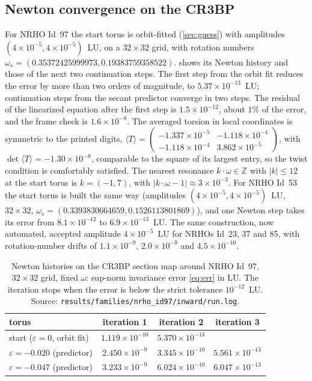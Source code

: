 \documentclass[11pt]{article}
\newcommand{\Z}{\mathbb{Z}}
\newcommand{\avg}[1]{\langle #1 \rangle}
\begin{document}
\subsection{Newton convergence on the CR3BP}\label{sec:newton}
For NRHO Id~97 the start torus is orbit-fitted (\cref{sec:guess}) with amplitudes
$(4\times10^{-5},4\times10^{-5})$~LU,
on a $32\times32$ grid, with rotation numbers $\omega_s = (0.35372425999973, 0.19383759358522)$.
 shows its Newton history and those of the next two continuation steps. The
first step from the orbit fit reduces the error by more than two orders of magnitude, to
$5.37\times10^{-13}$~LU; continuation steps from the secant predictor converge in two steps. The
residual of the linearized equation after the first step is $1.5\times10^{-12}$, about $1\%$ of the
error, and the frame check is $1.6\times10^{-8}$. The averaged torsion in local coordinates is
symmetric to the printed digits,
$\avg{T} = \left(\begin{smallmatrix}-1.337\times10^{-5} & -1.118\times10^{-4}\\
-1.118\times10^{-4} & 3.862\times10^{-5}\end{smallmatrix}\right)$, with
$\det\avg{T} = -1.30\times10^{-8}$, comparable to the square of its largest entry, so the twist
condition is comfortably satisfied. The nearest resonance $k\cdot\omega\in\Z$ with $|k|\le 12$ at the
start torus is $k=(-1,7)$, with $|k\cdot\omega - 1| \approx 3\times10^{-3}$.
For NRHO Id~53 the start torus is built the same way (amplitudes $(4\times10^{-5},4\times10^{-5})$~LU,
$32\times32$, $\omega_s = (0.3393830664659, 0.1526113801869)$), and one Newton step takes its error
from $8.1\times10^{-12}$ to $6.9\times10^{-13}$~LU. The same construction, now automated, accepted
amplitude $4\times10^{-5}$~LU for NRHOs Id~23, 37 and 85, with rotation-number drifts of
$1.1\times10^{-9}$, $2.0\times10^{-9}$ and $4.5\times10^{-10}$.

\begin{table}[t]
\centering
\caption{Newton histories on the CR3BP section map around NRHO Id~97, $32\times32$ grid, fixed
$\omega$: sup-norm invariance error \eqref{eq:err} in LU. The iteration stops when the error is
below the strict tolerance $10^{-12}$~LU. Source: \nolinkurl{results/families/nrho_id97/inward/run.log}.}
\label{tab:newton}
\begin{tabular}{lccc}
\toprule
torus & iteration 1 & iteration 2 & iteration 3 \\
\midrule
start ($\varepsilon=0$, orbit fit)    & $1.119\times10^{-10}$ & $5.370\times10^{-13}$ & \\
$\varepsilon=-0.020$ (predictor)      & $2.450\times10^{-9}$  & $3.345\times10^{-10}$ & $5.561\times10^{-13}$ \\
$\varepsilon=-0.047$ (predictor)      & $3.233\times10^{-9}$  & $6.024\times10^{-10}$ & $6.047\times10^{-13}$ \\
\bottomrule
\end{tabular}
\end{table}
\end{document}
